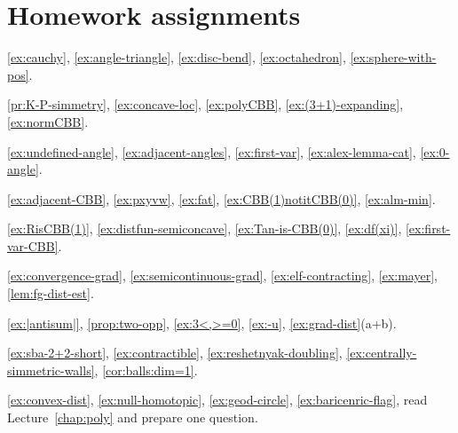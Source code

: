 \chapter*{Homework assignments}

\ref{ex:cauchy},
\ref{ex:angle-triangle},
\ref{ex:disc-bend},
\ref{ex:octahedron},
\ref{ex:sphere-with-pos}.

\ref{pr:K-P-simmetry},
\ref{ex:concave-loc},
\ref{ex:polyCBB},
\ref{ex:(3+1)-expanding},
\ref{ex:normCBB}.

\ref{ex:undefined-angle},
\ref{ex:adjacent-angles},
\ref{ex:first-var},
\ref{ex:alex-lemma-cat},
\ref{ex:0-angle}.

\ref{ex:adjacent-CBB},
\ref{ex:pxyvw},
\ref{ex:fat},
\ref{ex:CBB(1)notitCBB(0)},
\ref{ex:alm-min}.

\ref{ex:RisCBB(1)},
\ref{ex:distfun-semiconcave},
\ref{ex:Tan-is-CBB(0)},
\ref{ex:df(xi)},
\ref{ex:first-var-CBB}.

\ref{ex:convergence-grad},
\ref{ex:semicontinuous-grad},
\ref{ex:elf-contracting},
\ref{ex:mayer},
\ref{lem:fg-dist-est}.

\ref{ex:|antisum|},
\ref{prop:two-opp},
\ref{ex:3<,>=0},
\ref{ex:-u},
\ref{ex:grad-dist}(a+b).

\ref{ex:sba-2+2-short},
\ref{ex:contractible},
\ref{ex:reshetnyak-doubling},
\ref{ex:centrally-simmetric-walls},
\ref{cor:balls:dim=1}.

\ref{ex:convex-dist},
\ref{ex:null-homotopic},
\ref{ex:geod-circle},
\ref{ex:baricenric-flag},
read Lecture~\ref{chap:poly} and prepare one question.

